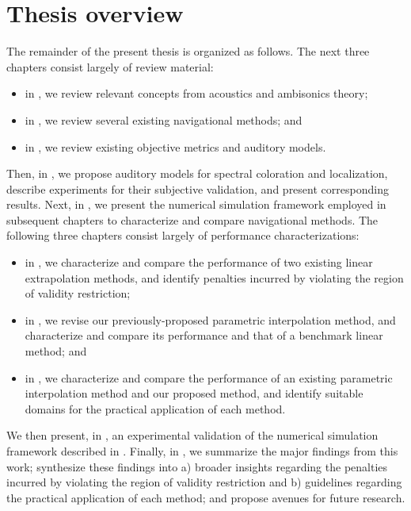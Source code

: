 \section{Thesis overview}
The remainder of the present thesis is organized as follows.
The next three chapters consist largely of review material:
\begin{itemize}
\item in , we review relevant concepts from acoustics and ambisonics theory;
\item in , we review several existing navigational methods; and
\item in , we review existing objective metrics and auditory models.
\end{itemize}
Then, in , we propose auditory models for spectral coloration and localization, describe experiments for their subjective validation, and present corresponding results.
Next, in , we present the numerical simulation framework employed in subsequent chapters to characterize and compare navigational methods.
The following three chapters consist largely of performance characterizations:
\begin{itemize}
\item in , we characterize and compare the performance of two existing linear extrapolation methods, and identify penalties incurred by violating the region of validity restriction;
\item in , we revise our previously-proposed parametric interpolation method, and characterize and compare its performance and that of a benchmark linear method; and
\item in , we characterize and compare the performance of an existing parametric interpolation method and our proposed method, and identify suitable domains for the practical application of each method.
\end{itemize}
We then present, in , an experimental validation of the numerical simulation framework described in .
Finally, in , we summarize the major findings from this work; synthesize these findings into a) broader insights regarding the penalties incurred by violating the region of validity restriction and b) guidelines regarding the practical application of each method; and propose avenues for future research.

